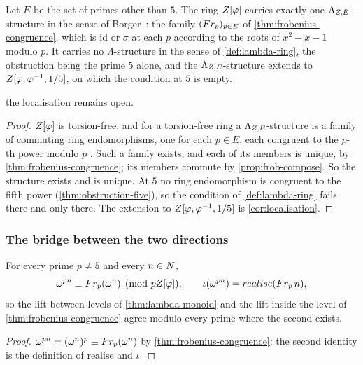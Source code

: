 \begin{theorem}\label{thm:descent-datum}
Let $E$ be the set of primes other than $5$.  The ring $Z[\varphi]$ carries exactly one
$\Lambda_{Z,E}$-structure in the sense of Borger~\cite[\S1]{borger11}: the family
$(Fr_p)_{p\in E}$ of \cref{thm:frobenius-congruence}, which is $\mathrm{id}$ or $\sigma$ at each $p$
according to the roots of $x^2-x-1$ modulo $p$.  It carries no $\Lambda$-structure in the sense of
\cref{def:lambda-ring}, the obstruction being the prime $5$ alone, and the $\Lambda_{Z,E}$-structure
extends to $Z[\varphi,\varphi^{-1},1/5]$, on which the condition at $5$ is empty.
\end{theorem}
the localisation remains open.
\begin{proof}
$Z[\varphi]$ is torsion-free, and for a torsion-free ring a $\Lambda_{Z,E}$-structure is a family of commuting
ring endomorphisms, one for each $p\in E$, each congruent to the $p$-th power modulo $p$
\cite[\S1]{borger11}.  Such a family exists, and each of its members is unique, by
\cref{thm:frobenius-congruence}; its members commute by \cref{prop:frob-compose}.  So the structure exists
and is unique.  At $5$ no ring endomorphism is congruent to the fifth power (\cref{thm:obstruction-five}),
so the condition of \cref{def:lambda-ring} fails there and only there.  The extension to $Z[\varphi,\varphi^{-1},1/5]$ is
\cref{cor:localisation}.
\end{proof}

\subsubsection{The bridge between the two directions}

\begin{corollary}\label{thm:monoid-ring-bridge}
For every prime $p\ne5$ and every $n\in N$,
\[
  \omega^{pn}\equiv Fr_p(\omega^{n})\pmod{pZ[\varphi]},\qquad
  \iota(\omega^{pn})=realise(Fr_p\,n),
\]
so the lift between levels of \cref{thm:lambda-monoid} and the lift inside the
level of \cref{thm:frobenius-congruence} agree modulo every prime where the second exists.
\end{corollary}
\begin{proof}
$\omega^{pn}=(\omega^{n})^{p}\equiv Fr_p(\omega^{n})$ by
\cref{thm:frobenius-congruence}; the second identity is the definition of
$\mathrm{realise}$ and $\iota$.
\end{proof}

